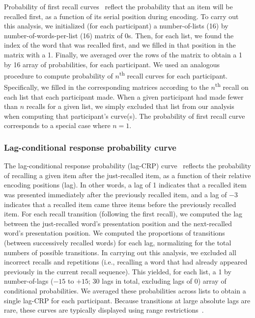 \documentclass[11pt]{article}
\begin{document}
Probability of first recall curves~\citep{AtkiShif68, PostPhil65, WelcBurn24}
reflect the probability that an item will be recalled first, as a function of
its serial position during encoding. To carry out this analysis, we initialized
(for each participant) a number-of-lists (16) by number-of-words-per-list (16)
matrix of 0s. Then, for each list, we found the index of the word that was
recalled first, and we filled in that position in the matrix with a 1. Finally,
we averaged over the rows of the matrix to obtain a 1 by 16 array of
probabilities, for each participant. We used an analogous procedure to compute
probability of $n$\textsuperscript{th} recall curves for each participant.
Specifically, we filled in the corresponding matrices according to the
$n$\textsuperscript{th} recall on each list that each participant made. When a
given participant had made fewer than $n$ recalls for a given list, we simply
excluded that list from our analysis when computing that participant's
curve(s). The probability of first recall curve corresponds to a special case
where $n = 1$.

\subsubsection*{Lag-conditional response probability curve}

The lag-conditional response probability (lag-CRP) curve~\citep{Kaha96}
reflects the probability of recalling a given item after the just-recalled
item, as a function of their relative encoding positions (lag). In other words,
a lag of 1 indicates that a recalled item was presented immediately after the
previously recalled item, and a lag of $-3$ indicates that a recalled item came
three items before the previously recalled item. For each recall transition
(following the first recall), we computed the lag between the just-recalled
word's presentation position and the next-recalled word's presentation
position. We computed the proportions of transitions (between successively
recalled words) for each lag, normalizing for the total numbers of possible
transitions. In carrying out this analysis, we excluded all incorrect recalls
and repetitions (i.e., recalling a word that had already appeared previously in
the current recall sequence). This yielded, for each list, a 1 by
number-of-lags ($-15$ to $+15$; 30 lags in total, excluding lags of 0) array of
conditional probabilities. We averaged these probabilities across lists to
obtain a single lag-CRP for each participant. Because transitions at large
absolute lags are rare, these curves are typically displayed using range
restrictions~\citep{Kaha12}.
\end{document}
